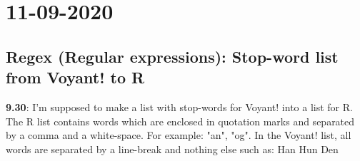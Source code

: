 \documentclass{article}
\begin{document}
\section{11-09-2020}
\subsection{Regex (Regular expressions): Stop-word list from Voyant! to R}

\textbf{9.30}: I'm supposed to make a list with stop-words for Voyant! into a list for R.  The R list contains words which are enclosed in quotation marks and separated by a comma and a white-space. For example: "an", "og". In the Voyant! list, all words are separated by a line-break and nothing else such as:
\break{}
Han
\break{}
Hun
\break{}
Den
\end{document}
